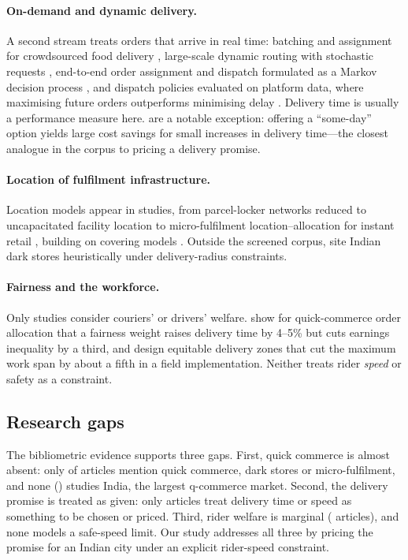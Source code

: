 \paragraph{On-demand and dynamic delivery.} A second stream treats orders that arrive in real time: batching and assignment for crowdsourced food delivery \citep{simoni2023}, large-scale dynamic routing with stochastic requests \citep{zhang2022}, end-to-end order assignment and dispatch formulated as a Markov decision process \citep{zamal2025}, and dispatch policies evaluated on platform data, where maximising future orders outperforms minimising delay \citep{mao2025}. Delivery time is usually a performance measure here. \citet{voigt2025} are a notable exception: offering a ``some-day'' option yields large cost savings for small increases in delivery time---the closest analogue in the corpus to pricing a delivery promise.

\paragraph{Location of fulfilment infrastructure.} Location models appear in \BibLocation{} studies, from parcel-locker networks reduced to uncapacitated facility location \citep{deutsch2017} to micro-fulfilment location--allocation for instant retail \citep{luo2026}, building on covering models \citep{toregas1971,church1974}. Outside the screened corpus, \citet{kewalramani2023} site Indian dark stores heuristically under delivery-radius constraints.

\paragraph{Fairness and the workforce.} Only \BibWelfare{} studies consider couriers' or drivers' welfare. \citet{bhattacharya2026} show for quick-commerce order allocation that a fairness weight raises delivery time by 4--5\% but cuts earnings inequality by a third, and \citet{carlsson2026} design equitable delivery zones that cut the maximum work span by about a fifth in a field implementation. Neither treats rider \emph{speed} or safety as a constraint.

\subsection{Research gaps}

The bibliometric evidence supports three gaps. First, quick commerce is almost absent: only \BibQComm{} of \BibIncluded{} articles mention quick commerce, dark stores or micro-fulfilment, and none (\BibIndia) studies India, the largest q-commerce market. Second, the delivery promise is treated as given: only \BibPromise{} articles treat delivery time or speed as something to be chosen or priced. Third, rider welfare is marginal (\BibWelfare{} articles), and none models a safe-speed limit. Our study addresses all three by pricing the promise for an Indian city under an explicit rider-speed constraint.
